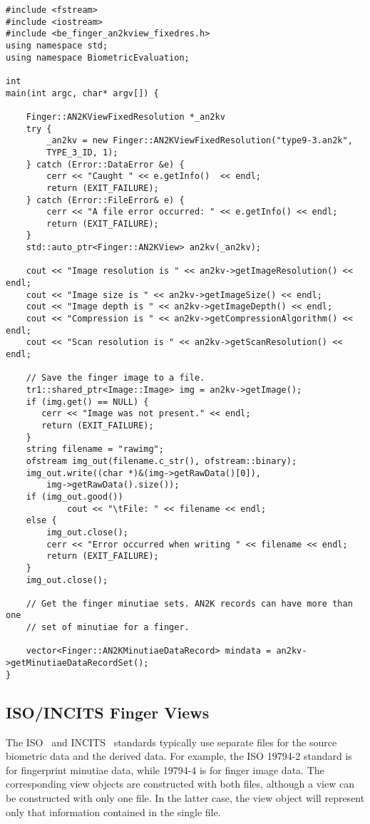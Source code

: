 \begin{lstlisting}[caption={Using an AN2K Finger View}, label=lst:an2kfingerviewuse]
#include <fstream>
#include <iostream>
#include <be_finger_an2kview_fixedres.h>
using namespace std;
using namespace BiometricEvaluation;

int
main(int argc, char* argv[]) {

    Finger::AN2KViewFixedResolution *_an2kv
    try {
        _an2kv = new Finger::AN2KViewFixedResolution("type9-3.an2k",
	    TYPE_3_ID, 1);
    } catch (Error::DataError &e) {
        cerr << "Caught " << e.getInfo()  << endl;
        return (EXIT_FAILURE);
    } catch (Error::FileError& e) {
        cerr << "A file error occurred: " << e.getInfo() << endl;
        return (EXIT_FAILURE);
    }
    std::auto_ptr<Finger::AN2KView> an2kv(_an2kv);

    cout << "Image resolution is " << an2kv->getImageResolution() << endl;
    cout << "Image size is " << an2kv->getImageSize() << endl;
    cout << "Image depth is " << an2kv->getImageDepth() << endl;
    cout << "Compression is " << an2kv->getCompressionAlgorithm() << endl;
    cout << "Scan resolution is " << an2kv->getScanResolution() << endl;

    // Save the finger image to a file.
    tr1::shared_ptr<Image::Image> img = an2kv->getImage();
    if (img.get() == NULL) {
       cerr << "Image was not present." << endl;
       return (EXIT_FAILURE);
    }
    string filename = "rawimg";
    ofstream img_out(filename.c_str(), ofstream::binary);
    img_out.write((char *)&(img->getRawData()[0]),
        img->getRawData().size());
    if (img_out.good())
            cout << "\tFile: " << filename << endl;
    else {
        img_out.close();
        cerr << "Error occurred when writing " << filename << endl;
        return (EXIT_FAILURE);
    }
    img_out.close();

    // Get the finger minutiae sets. AN2K records can have more than one
    // set of minutiae for a finger.

    vector<Finger::AN2KMinutiaeDataRecord> mindata = an2kv->getMinutiaeDataRecordSet();
}
\end{lstlisting}

\subsection{ISO/INCITS Finger Views}

The ISO~\cite{isosc37} and INCITS~\cite{incits} standards typically use
separate files for the source biometric data and the derived data. For example,
the ISO 19794-2 standard is for fingerprint minutiae data, while 19794-4 is for
finger image data. The corresponding \sname view objects are constructed with
both files, although a view can be constructed with only one file. In the
latter case, the view object will represent only that information contained in
the single file.

